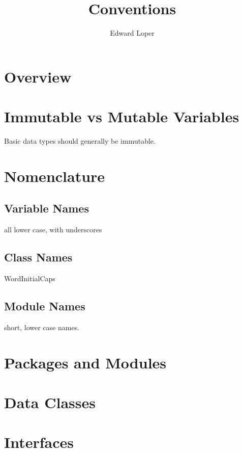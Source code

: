 \documentclass{article}
\begin{document}
\title{Conventions}
\author{Edward Loper}
\maketitle

\section{Overview}


\section{Immutable vs Mutable Variables}

  Basic data types should generally be immutable.

\section{Nomenclature}

  \subsection{Variable Names}

    all lower case, with underscores

  \subsection{Class Names}

    WordInitialCaps

  \subsection{Module Names}

    short, lower case names.

\section{Packages and Modules}


\section{Data Classes}


\section{Interfaces}
\end{document}
